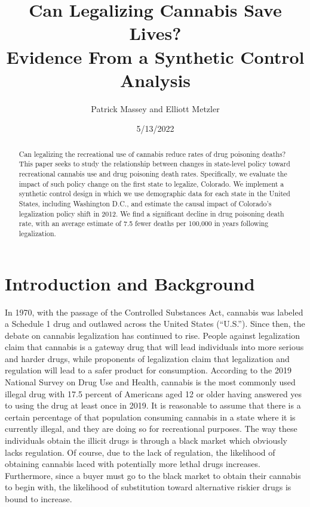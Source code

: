 \documentclass{article}
\author{Patrick Massey and Elliott Metzler}
\title{Can Legalizing Cannabis Save Lives? \\
Evidence From a Synthetic Control Analysis}
\date{5/13/2022}
\begin{document}
\maketitle

\begin{abstract}

Can legalizing the recreational use of cannabis reduce rates of drug poisoning deaths? This paper seeks to study the relationship between changes in state-level policy toward recreational cannabis use and drug poisoning death rates. Specifically, we evaluate the impact of such policy change on the first state to legalize, Colorado. We implement a synthetic control design in which we use demographic data for each state in the United States, including Washington D.C., and estimate the causal impact of Colorado's legalization policy shift in 2012. We find a significant decline in drug poisoning death rate, with an average estimate of 7.5 fewer deaths per 100,000 in years following legalization.

\end{abstract}

\newpage

\section{Introduction and Background}

In 1970, with the passage of the Controlled Substances Act, cannabis was labeled a Schedule 1 drug and outlawed across the United States (``U.S.''). Since then, the debate on cannabis legalization has continued to rise. People against legalization claim that cannabis is a gateway drug that will lead individuals into more serious and harder drugs, while proponents of legalization claim that legalization and regulation will lead to a safer product for consumption. According to the 2019 National Survey on Drug Use and Health, cannabis is the most commonly used illegal drug with 17.5 percent of Americans aged 12 or older having answered yes to using the drug at least once in 2019.  It is reasonable to assume that there is a certain percentage of that population consuming cannabis in a state where it is currently illegal, and they are doing so for recreational purposes. The way these individuals obtain the illicit drugs is through a black market which obviously lacks regulation. Of course, due to the lack of regulation, the likelihood of obtaining cannabis laced with potentially more lethal drugs increases. Furthermore, since a buyer must go to the black market to obtain their cannabis to begin with, the likelihood of substitution toward alternative riskier drugs is bound to increase.
\end{document}
